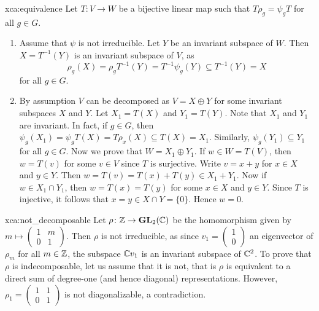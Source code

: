 \begin{sol}{xca:equivalence}
Let $T\colon V\to W$ be a bijective linear map such that $T\rho_g=\psi_gT$ for all $g\in G$. 
\begin{enumerate}
	\item Assume that $\psi$ is not irreducible. Let $Y$ be an invariant subspace of $W$. 
		Then $X=T^{-1}(Y)$ is an invariant subspace of $V$, as 
		\[
		\rho_g(X)=\rho_gT^{-1}(Y)=T^{-1}\psi_g(Y)\subseteq T^{-1}(Y)=X
		\]
		for all $g\in G$. 
	\item By assumption
		$V$ can be decomposed as $V=X\oplus Y$ for some invariant subspaces $X$ and $Y$. Let $X_1=T(X)$ 
		and $Y_1=T(Y)$. 
		Note that $X_1$ and $Y_1$ are invariant. In fact, if $g\in G$, then  
		$\psi_g(X_1)=\psi_g T(X)=T\rho_x(X)\subseteq T(X)=X_1$.
		Similarly, $\psi_g(Y_1)\subseteq Y_1$ 
		for all $g\in G$. Now we prove that $W=X_1\oplus Y_1$. If $w\in W=T(V)$, then 
		$w=T(v)$ for some $v\in V$ since $T$ is surjective. Write $v=x+y$ for $x\in X$ and $y\in Y$. Then 
		$w=T(v)=T(x)+T(y)\in X_1+Y_1$. Now if $w\in X_1\cap Y_1$, then $w=T(x)=T(y)$ for some $x\in X$ and
		$y\in Y$. Since $T$ is injective, it follows that $x=y\in X\cap Y=\{0\}$. Hence $w=0$. 
	\end{enumerate}	
\end{sol}

\begin{sol}{xca:not_decomposable}
    Let $\rho\colon \mathbb{Z}\to\mathbf{GL}_2(\mathbb{C})$ be the homomorphism given by 
    $m\mapsto\begin{pmatrix}1&m\\0&1\end{pmatrix}$. Then $\rho$ is not irreducible, as
    since $v_1=\begin{pmatrix}1\\0\end{pmatrix}$
    an eigenvector of $\rho_m$ for all $m\in\mathbb{Z}$, 
    the subspace $\mathbb{C} v_1$ is an invariant subspace of $\mathbb{C}^2$. To prove that $\rho$ is 
    indecomposable, let us assume that 
    it is not, that is $\rho$ is equivalent to a direct sum of degree-one (and hence diagonal) 
    representations. However, $\rho_1=\begin{pmatrix}1&1\\0&1\end{pmatrix}$ is not diagonalizable, 
    a contradiction. 
\end{sol}



